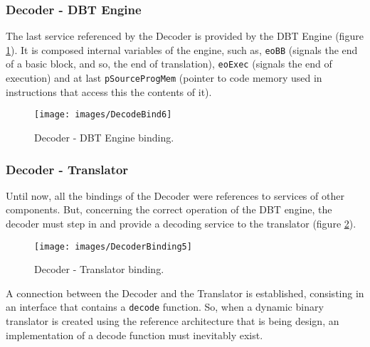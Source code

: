     
\subsubsection*{Decoder - DBT Engine}   
    The last service referenced by the Decoder is provided by the DBT Engine (figure \ref{fig:DecoderBind6}). It is composed internal variables of the engine, such as, \texttt{eoBB} (signals the end of a basic block, and so, the end of translation), \texttt{eoExec} (signals the end of execution) and at last \texttt{pSourceProgMem} (pointer to code memory used in instructions that access this the contents of it).
    
	\begin{figure}[!htb]
    \centerline{
    \texttt{[image: images/DecodeBind6]}
    }
    \caption{Decoder - DBT Engine binding.}
    \label{fig:DecoderBind6} 
    \end{figure}
    

\subsubsection*{Decoder - Translator}

	Until now, all the bindings of the Decoder were references to services of other components. But, concerning the correct operation of the DBT engine, the decoder must step in and provide a decoding service to the translator (figure \ref{fig:DecoderBind5}).
    
	\begin{figure}[!htb]
    \centerline{
    \texttt{[image: images/DecoderBinding5]}
    }
    \caption{Decoder - Translator binding.}
    \label{fig:DecoderBind5} 
    \end{figure}
    
    A connection between the Decoder and the Translator is established, consisting in an interface that contains a \texttt{decode} function. So, when a dynamic binary translator is created using the reference architecture that is being design, an implementation of a decode function must inevitably exist.

